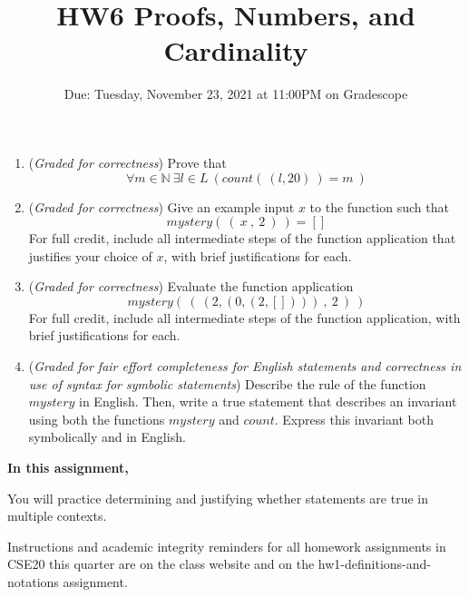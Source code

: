 \begin{enumerate}
   \begin{enumerate}
        \item ({\it Graded for correctness}) Prove that
            \[
                \forall m \in \mathbb{N}~ \exists l \in L ~\left( count(~(l,20)~) = m~ \right)
            \]

        \item ({\it Graded for correctness}) Give an example input $x$ to the function such that 
            \[
               mystery( ~(~ x ~,~ 2~) ~) = []
            \]
           For full credit, include all intermediate steps of the function application
           that justifies your choice of $x$, with brief justifications for each.

        \item ({\it Graded for correctness}) Evaluate the function application
            \[
                mystery( ~(~ (2, (0, (2, []) ) ) ~,~ 2~) ~)
            \]
         For full credit, include all intermediate steps of the function application,
         with brief justifications for each.
   
        \item ({\it Graded for fair effort completeness for English statements and correctness in use 
        of syntax for symbolic statements}) Describe the rule of the function 
        $mystery$ in English. Then, write a true statement that describes an invariant using
        both the functions $mystery$ and $count$. Express this invariant both symbolically 
        and in English.
    \end{enumerate}

\end{enumerate}

    
\newpage

\title{HW6 Proofs, Numbers, and Cardinality}
\date{Due: Tuesday, November 23, 2021 at 11:00PM on Gradescope}


\maketitle
\thispagestyle{fancy}

{\bf In this assignment,}

You will practice determining and justifying whether 
statements are true in multiple contexts.

Instructions and academic integrity reminders for all homework assignments in 
CSE20 this quarter are on the class website and on the hw1-definitions-and-notations
assignment.

